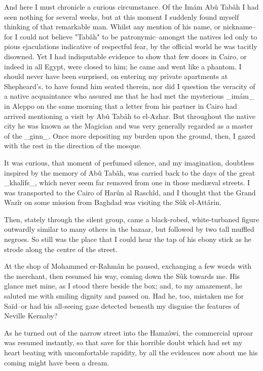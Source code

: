 And here I must chronicle a curious circumstance. Of the Imám Abû
Tabâh I had seen nothing for several weeks, but at this moment I
suddenly found myself thinking of that remarkable man. Whilst any
mention of his name, or nickname--for I could not believe "Tabâh" to
be patronymic--amongst the natives led only to pious ejaculations
indicative of respectful fear, by the official world he was tacitly
disowned. Yet I had indisputable evidence to show that few doors in
Cairo, or indeed in all Egypt, were closed to him; he came and went
like a phantom. I should never have been surprised, on entering my
private apartments at Shepheard's, to have found him seated therein,
nor did I question the veracity of a native acquaintance who assured
me that he had met the mysterious _imám_ in Aleppo on the same morning
that a letter from his partner in Cairo had arrived mentioning a visit
by Abû Tabâh to el-Azhar. But throughout the native city he was known
as the Magician and was very generally regarded as a master of the
_ginn_. Once more depositing my burden upon the ground, then, I gazed
with the rest in the direction of the mosque.

It was curious, that moment of perfumed silence, and my imagination,
doubtless inspired by the memory of Abû Tabâh, was carried back to the
days of the great _khalîfs_, which never seem far removed from one in
those mediæval streets. I was transported to the Cairo of Harûn al
Raschîd, and I thought that the Grand Wazîr on some mission from
Baghdad was visiting the Sûk el-Attârin.

Then, stately through the silent group, came a black-robed,
white-turbaned figure outwardly similar to many others in the bazaar,
but followed by two tall muffled negroes. So still was the place that
I could hear the tap of his ebony stick as he strode along the centre
of the street.

At the shop of Mohammed er-Rahmân he paused, exchanging a few words
with the merchant, then resumed his way, coming down the Sûk towards
me. His glance met mine, as I stood there beside the box; and, to my
amazement, he saluted me with smiling dignity and passed on. Had he,
too, mistaken me for Saïd--or had his all-seeing gaze detected beneath
my disguise the features of Neville Kernaby?

As he turned out of the narrow street into the Hamzâwi, the commercial
uproar was resumed instantly, so that save for this horrible doubt
which had set my heart beating with uncomfortable rapidity, by all the
evidences now about me his coming might have been a dream.


